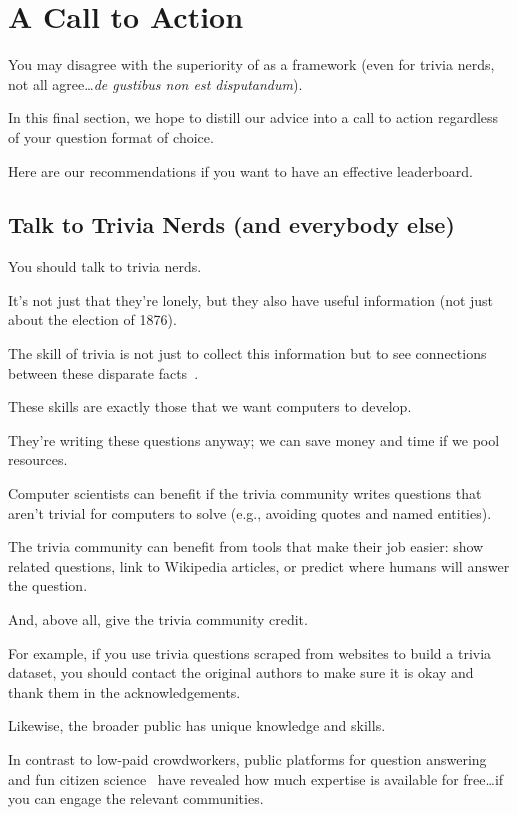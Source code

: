 
\section{A Call to Action}
\label{sec:call}



You may disagree with the superiority of \qb{} as a \qa{} framework (even for trivia nerds, not all agree\dots \textit{de gustibus non est disputandum}).

In this final section, we hope to distill our advice into a call to action regardless of your question format of choice.

Here are our recommendations if you want to have an effective leaderboard.

\subsection{Talk to Trivia Nerds (and everybody else)}

You should talk to trivia nerds.

It's not just that they're lonely, but they also have useful information (not just about the election of 1876).

The skill of trivia is not just to collect this information but to see connections between these disparate facts~\citep{jennings-06}.

These skills are exactly those that we want computers to develop.

They're writing these questions anyway; we can save money and time if we pool resources.

Computer scientists can benefit if the trivia community writes questions that aren't trivial for computers to solve (e.g., avoiding quotes and named entities).

The trivia community can benefit from tools that make their job easier: show related questions, link to Wikipedia articles, or predict where humans will answer the question.

And, above all, give the trivia community credit.

For example, if you use trivia questions scraped from websites to build a trivia \qa{} dataset, you should contact the original authors to make sure it is okay and thank them in the acknowledgements.  

Likewise, the broader public has unique knowledge and skills.

In contrast to low-paid crowdworkers, public platforms for question answering and fun citizen science~\citep{bowser-13} have revealed how much expertise is available for free\dots if you can engage the relevant communities.

